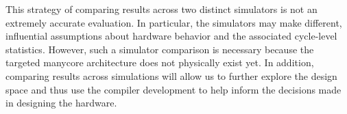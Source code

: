 \documentclass{sig-alternate-05-2015}
\begin{document}
This strategy of comparing results across two distinct simulators is not an extremely accurate evaluation. In particular, the simulators may make different, influential assumptions about hardware behavior and the associated cycle-level statistics. However, such a simulator comparison is necessary because the targeted manycore architecture does not physically exist yet. In addition, comparing results across simulations will allow us to further explore the design space and thus use the compiler development to help inform the decisions made in designing the hardware.

 
\end{document}
